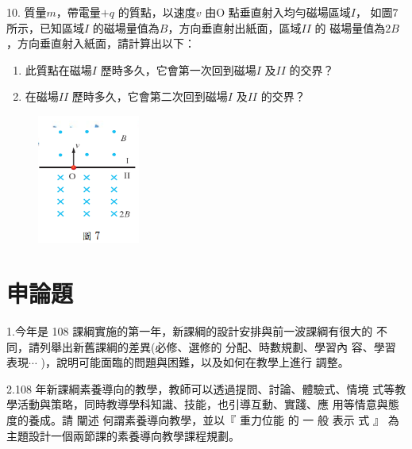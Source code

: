 \documentclass[cn,10pt,math=newtx,chinesefont=founder,device=ig]{elegantbook}
\begin{document}
\begin{example}
   10. 質量$m$，帶電量$+q$ 的質點，以速度$v$ 由O 點垂直射入均勻磁場區域$I$，
如圖7 所示，已知區域$I$ 的磁場量值為$B$，方向垂直射出紙面，區域$II$ 的
磁場量值為$2B$，方向垂直射入紙面，請計算出以下：
\begin{enumerate}[label=(\arabic*)] 
  \item 此質點在磁場$I$ 歷時多久，它會第一次回到磁場$I$ 及$II$ 的交界？
  \item 在磁場$II$ 歷時多久，它會第二次回到磁場$I$ 及$II$ 的交界？
    \end{enumerate}

    \rightline{[高雄聯招教甄109]}
\end{example}
\begin{solution}
    
\end{solution}
\begin{figure}[htbp]
    \flushright
    \includegraphics[width=0.3\textwidth]{image/109高雄10.png}
  \end{figure}
\newpage

\section{申論題}

\begin{example}
   1.今年是 108 課綱實施的第一年，新課綱的設計安排與前一波課綱有很大的
不同，請列舉出新舊課綱的差異(必修、選修的 分配、時數規劃、學習內
容、學習表現$\cdots$ )，說明可能面臨的問題與困難，以及如何在教學上進行
調整。\\
    \rightline{[高雄聯招教甄109]}
\end{example}
\begin{solution}
    
\end{solution}

\newpage

\begin{example}
   2.108 年新課綱素養導向的教學，教師可以透過提問、討論、體驗式、情境
式等教學活動與策略，同時教導學科知識、技能，也引導互動、實踐、應
用等情意與態度的養成。請 闡述 何謂素養導向教學，並以$『$ 重力位能 的 一
般 表示 式 $』$ 為主題設計一個兩節課的素養導向教學課程規劃。\\
    \rightline{[高雄聯招教甄109]}
\end{example}
\begin{solution}
    
\end{solution}
\end{document}
